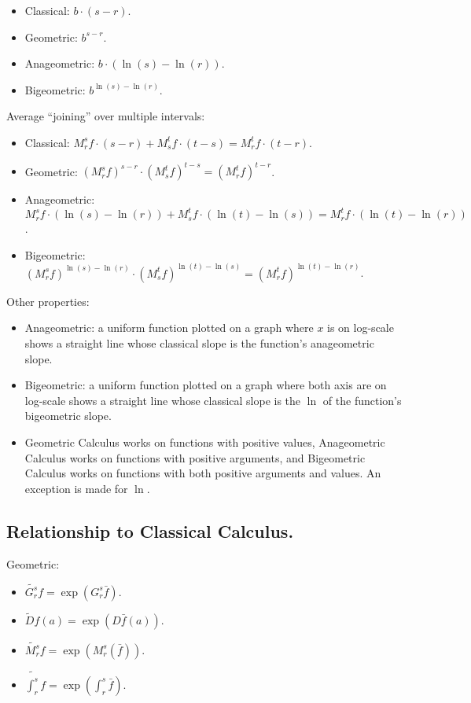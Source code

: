 \begin{itemize}
	\item Classical: $b \cdot (s - r)$.
	\item Geometric: $b^{s-r}$.
	\item Anageometric: $b \cdot (\ln(s) - \ln(r))$.
	\item Bigeometric: $b^{\ln(s) - \ln(r)}$.
\end{itemize}

Average \enquote{joining} over multiple intervals:

\begin{itemize}
	\item Classical: $M_r^s f \cdot (s - r) + M_s^t f \cdot (t - s) = M_r^t f \cdot (t - r)$.
	\item Geometric: $(M_r^s f)^{s - r} \cdot (M_s^t f)^{t - s} = (M_r^t f)^{t - r}$.
	\item Anageometric: $M_r^s f \cdot (\ln(s) - \ln(r)) + M_s^t f \cdot (\ln(t) - \ln(s)) = M_r^t f \cdot (\ln(t) - \ln(r))$.
	\item Bigeometric: $(M_r^s f)^{\ln(s) - \ln(r)} \cdot (M_s^t f)^{\ln(t) - \ln(s)} = (M_r^t f)^{\ln(t) - \ln(r)}$.
\end{itemize}

Other properties:

\begin{itemize}
	\item Anageometric: a uniform function plotted on a graph where $x$ is on log-scale shows a straight line whose classical slope is the function's anageometric slope.
	\item Bigeometric: a uniform function plotted on a graph where both axis are on log-scale shows a straight line whose classical slope is the $\ln$ of the function's bigeometric slope. 
	\item Geometric Calculus works on functions with positive values, Anageometric Calculus works on functions with positive arguments, and Bigeometric Calculus works on functions with both positive arguments and values. An exception is made for $\ln$.
\end{itemize}

\subsection{Relationship to Classical Calculus.}

Geometric:

\begin{itemize}
	\item $\tilde{G_r^s}f = \exp(G_r^s \bar{f})$.
	\item $\tilde{D}f(a) = \exp(D\bar{f}(a))$.
	\item $\tilde{M_r^s}f = \exp(M_r^s(\bar{f}))$.
	\item $\tilde{\int_r^s} f = \exp(\int_r^s \bar{f})$.
\end{itemize}

